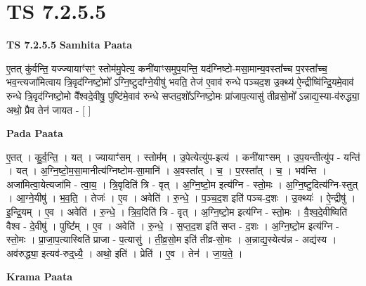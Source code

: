 \documentclass[17pt]{extarticle}
\begin{document}
\section{ TS 7.2.5.5 }

\textbf{TS 7.2.5.5 } \newline
\textbf{Samhita Paata} \newline

ए॒तत् कु॑र्वन्ति॒ यज्ज्यायाꣳ॑सꣳ॒॒ स्तोम॑मु॒पेत्य॒ कनी॑याꣳसमुप॒यन्ति॒ यद॑ग्निष्टो-मसा॒मान्य॒वस्ता᳚च्च प॒रस्ता᳚च्च॒ भव॒न्त्यजा॑मित्वाय त्रि॒वृद॑ग्निष्टो॒मो᳚ ऽग्नि॒ष्टुदा᳚ग्ने॒यीषु॑ भवति॒ तेज॑ ए॒वाव॑ रुन्धे पञ्चद॒श उ॒क्थ्य॑ ऐ॒न्द्रीष्वि॑न्द्रि॒यमे॒वाव॑ रुन्धे त्रि॒वृद॑ग्निष्टो॒मो वै᳚श्वदे॒वीषु॒ पुष्टि॑मे॒वाव॑ रुन्धे सप्तद॒शो᳚ऽग्निष्टो॒मः प्रा॑जाप॒त्यासु॑ तीव्रसो॒मो᳚ ऽन्नाद्य॒स्या-व॑रुद्ध्या॒ अथो॒ प्रैव तेन॑ जायत - [  ] \newline

\textbf{Pada Paata} \newline

ए॒तत् । कु॒र्व॒न्ति॒ । यत् । ज्यायाꣳ॑सम् । स्तोम᳚म् । उ॒पेत्येत्यु॑प-इत्य॑ । कनी॑याꣳसम् । उ॒प॒यन्तीत्यु॑प - यन्ति॑ । यत् । अ॒ग्नि॒ष्टो॒म॒सा॒मानीत्य॑ग्निष्टोम-सा॒मानि॑ । अ॒वस्ता᳚त् । च॒ । प॒रस्ता᳚त् । च॒ । भव॑न्ति । अजा॑मित्वा॒येत्यजा॑मि - त्वा॒य॒ । त्रि॒वृदिति॑ त्रि - वृत् । अ॒ग्नि॒ष्टो॒म इत्य॑ग्नि - स्तो॒मः । अ॒ग्नि॒ष्टुदित्य॑ग्नि-स्तुत् । आ॒ग्ने॒यीषु॑ । भ॒व॒ति॒ । तेजः॑ । ए॒व । अवेति॑ । रु॒न्धे॒ । प॒ञ्च॒द॒श इति॑ पञ्च-द॒शः । उ॒क्थ्यः॑ । ऐ॒न्द्रीषु॑ । इ॒न्द्रि॒यम् । ए॒व । अवेति॑ । रु॒न्धे॒ । त्रि॒व॒दिति॑ त्रि - वृत् । अ॒ग्नि॒ष्टो॒म इत्य॑ग्नि - स्तो॒मः । वै॒श्व॒दे॒वीष्विति॑ वैश्व - दे॒वीषु॑ । पुष्टि᳚म् । ए॒व । अवेति॑ । रु॒न्धे॒ । स॒प्त॒द॒श इति॑ सप्त - द॒शः । अ॒ग्नि॒ष्टो॒म इत्य॑ग्नि - स्तो॒मः । प्रा॒जा॒प॒त्यास्विति॑ प्राजा - प॒त्यासु॑ । ती॒व्र॒सो॒म इति॑ तीव्र-सो॒मः । अ॒न्नाद्य॒स्येत्य॑न्न - अद्य॑स्य । अव॑रुद्ध्या॒ इत्यव॑-रुद्॒ध्यै॒ । अथो॒ इति॑ । प्रेति॑ । ए॒व । तेन॑ । जा॒य॒ते॒ ।  \newline


\textbf{Krama Paata} \newline
\end{document}

